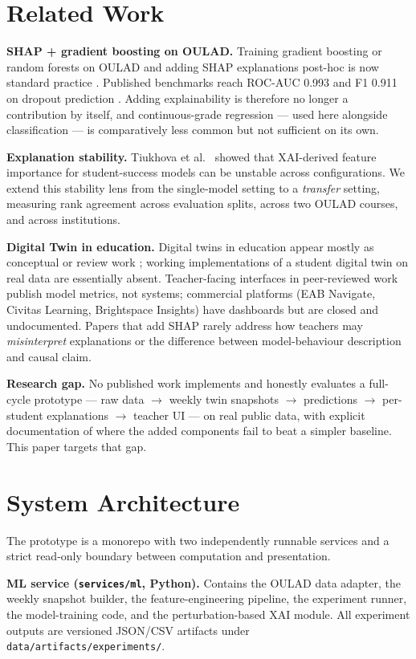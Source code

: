 \documentclass[conference]{IEEEtran}
\begin{document}
\section{Related Work}
\textbf{SHAP + gradient boosting on OULAD.} Training gradient boosting or random
forests on OULAD and adding SHAP explanations post-hoc is now standard practice
\cite{lopez2025,review2026,xai2025,frontiers2025}. Published benchmarks reach
ROC-AUC 0.993 and F1 0.911 on dropout prediction \cite{lopez2025}. Adding
explainability is therefore no longer a contribution by itself, and
continuous-grade regression --- used here alongside classification --- is
comparatively less common but not sufficient on its own.

\textbf{Explanation stability.} Tiukhova et al.\ \cite{tiukhova2024} showed that
XAI-derived feature importance for student-success models can be unstable across
configurations. We extend this stability lens from the single-model setting to a
\emph{transfer} setting, measuring rank agreement across evaluation splits,
across two OULAD courses, and across institutions.

\textbf{Digital Twin in education.} Digital twins in education appear mostly as
conceptual or review work \cite{dt2022}; working implementations of a student
digital twin on real data are essentially absent. Teacher-facing interfaces in
peer-reviewed work publish model metrics, not systems; commercial platforms (EAB
Navigate, Civitas Learning, Brightspace Insights) have dashboards but are closed
and undocumented. Papers that add SHAP rarely address how teachers may
\emph{misinterpret} explanations or the difference between model-behaviour
description and causal claim.

\textbf{Research gap.} No published work implements and honestly evaluates a
full-cycle prototype --- raw data $\rightarrow$ weekly twin snapshots
$\rightarrow$ predictions $\rightarrow$ per-student explanations $\rightarrow$
teacher UI --- on real public data, with explicit documentation of where the
added components fail to beat a simpler baseline. This paper targets that gap.

\section{System Architecture}
The prototype is a monorepo with two independently runnable services and a strict
read-only boundary between computation and presentation.

\textbf{ML service (\texttt{services/ml}, Python).} Contains the OULAD data
adapter, the weekly snapshot builder, the feature-engineering pipeline, the
experiment runner, the model-training code, and the perturbation-based XAI
module. All experiment outputs are versioned JSON/CSV artifacts under
\texttt{data/artifacts/experiments/}.
\end{document}
